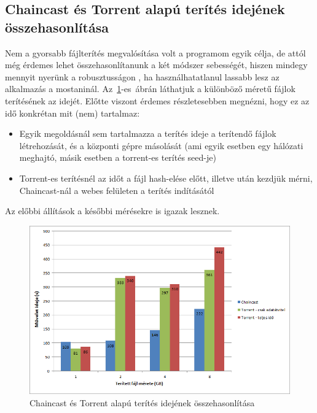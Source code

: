 %
\subsection{Chaincast és Torrent alapú terítés idejének összehasonlítása}
%

Nem a gyorsabb fájlterítés megvalósítása volt a programom egyik célja, de attól még érdemes lehet összehasonlítanunk a két módszer sebességét, hiszen mindegy mennyit nyerünk a robusztusságon , ha használhatatlanul lassabb lesz az alkalmazás a mostaninál. Az~\ref{fig:chaincasttorrrentcomparison}-es~ábrán láthatjuk a különböző méretű fájlok terítésének az idejét. Előtte viszont érdemes részletesebben megnézni, hogy ez az idő konkrétan mit (nem) tartalmaz:

\begin{itemize}
  \item Egyik megoldásnál sem tartalmazza a terítés ideje a terítendő fájlok létrehozását, és a központi gépre másolását (ami egyik esetben egy hálózati meghajtó, másik esetben a torrent-es terítés seed-je)
  \item Torrent-es terítésnél az időt a fájl hash-elése előtt, illetve után kezdjük mérni, Chaincast-nál a webes felületen a terítés indításától
\end{itemize}

Az előbbi állítások a későbbi mérésekre is igazak lesznek.

\begin{figure}[ht]
\centering
\includegraphics[width=150mm, keepaspectratio]{figures/Perf_chaincast_torrent_comparison.png}
\caption{Chaincast és Torrent alapú terítés idejének összehasonlítása}
\label{fig:chaincasttorrrentcomparison}
\end{figure}

